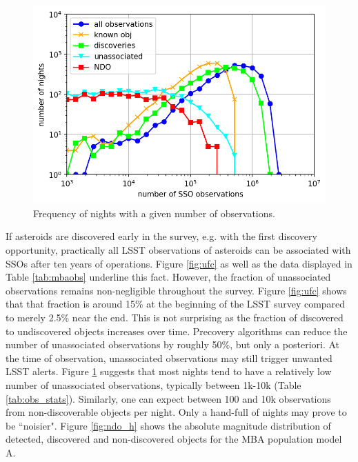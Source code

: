 %
\begin{figure}[tb!]
\begin{center}
\includegraphics[width=0.7\linewidth]{figs/nights_vs_obs.png} 
\end{center}
\caption{Frequency of nights with a given number of observations.\label{fig:obs_stats}}
\end{figure}
If asteroids are discovered early in the survey, e.g. with the first discovery opportunity, practically all LSST observations of asteroids can be associated with SSOs after ten years of operations. Figure \ref{fig:ufc} as well as the data displayed in Table \ref{tab:mbaobs} underline this fact. 
However, the fraction of unassociated observations remains non-negligible throughout the survey.  
Figure \ref{fig:ufc} shows that that fraction is around 15\% at the beginning of the LSST survey compared to merely 2.5\% near the end. This is not surprising as the fraction of discovered to undiscovered objects increases over time.
Precovery algorithms can reduce the number of unassociated observations by roughly 50\%, but only a posteriori. 
At the time of observation, unassociated observations may still trigger unwanted LSST alerts. 
Figure \ref{fig:obs_stats} suggests that most nights tend to have a relatively low number of unassociated observations, typically between 1k-10k (Table \ref{tab:obs_stats}). Similarly, one can expect between 100 and 10k observations from non-discoverable objects per night. Only a hand-full of nights may prove to be ``noisier".
Figure \ref{fig:ndo_h} shows the absolute magnitude distribution of detected, discovered and non-discovered objects for the MBA population model A.
